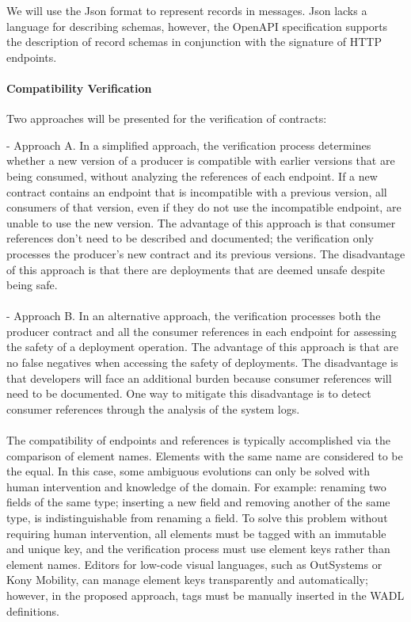 We will use the Json format to represent records in messages.
Json lacks a language for describing schemas, however, the OpenAPI specification supports the description of record schemas in conjunction with the signature of HTTP endpoints.

\paragraph{Compatibility Verification}

Two approaches will be presented for the verification of contracts:

- Approach A. In a simplified approach, the verification process determines whether a new version of a producer
is compatible with earlier versions that are being consumed, without analyzing the references of each endpoint.
If a new contract contains an endpoint that is incompatible with a previous version, all consumers of that version,
even if they do not use the incompatible endpoint, are unable to use the new version.
The advantage of this approach is that consumer references don't need to be described and documented;
the verification only processes the producer's new contract and its previous versions.
The disadvantage of this approach is that there are deployments that are deemed unsafe despite being safe.

\paragraph{}

- Approach B. In an alternative approach, the verification processes both the producer contract and all the consumer references in each endpoint for
assessing the safety of a deployment operation.
The advantage of this approach is that are no false negatives when accessing the safety of deployments.
The disadvantage is that developers will face an additional burden because consumer references will need to be documented.
One way to mitigate this disadvantage is to detect consumer references through the analysis of the system logs.

\paragraph{}

The compatibility of endpoints and references is typically accomplished via the comparison of element names.
Elements with the same name are considered to be the equal.
In this case, some ambiguous evolutions can only be solved with human intervention and knowledge of the domain.
For example: renaming two fields of the same type; inserting a new field and removing another of the same type, is indistinguishable from renaming a field.
To solve this problem without requiring human intervention,
all elements must be tagged with an immutable and unique key,
and the verification process must use element keys rather than element names.
Editors for low-code visual languages, such as OutSystems or Kony Mobility, can manage element keys transparently and automatically;
however, in the proposed approach, tags must be manually inserted in the WADL definitions.

